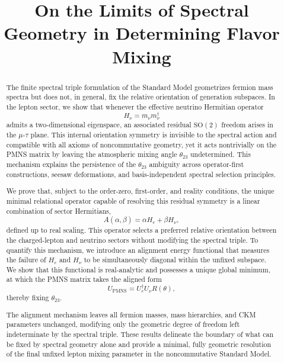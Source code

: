 \usepackage{amsfonts}
\usepackage{amstext}
\usepackage{amsopn}
\usepackage{amsthm}
\usepackage{amssymb}
\usepackage{amsmath}
\usepackage{hyperref}



\title{On the Limits of Spectral Geometry in Determining Flavor Mixing}

\maketitle

\begin{abstract}
The finite spectral triple formulation of the Standard Model geometrizes fermion mass spectra but does not, in general, fix the relative orientation of generation subspaces. In the lepton sector, we show that whenever the effective neutrino Hermitian operator
\[
H_\nu = m_\nu m_\nu^\dagger
\]
admits a two-dimensional eigenspace, an associated residual $\mathrm{SO}(2)$ freedom arises in the $\mu$-$\tau$ plane. This internal orientation symmetry is invisible to the spectral action and compatible with all axioms of noncommutative geometry, yet it acts nontrivially on the PMNS matrix by leaving the atmospheric mixing angle $\theta_{23}$ undetermined. This mechanism explains the persistence of the $\theta_{23}$ ambiguity across operator-first constructions, seesaw deformations, and basis-independent spectral selection principles.

We prove that, subject to the order-zero, first-order, and reality conditions, the unique minimal relational operator capable of resolving this residual symmetry is a linear combination of sector Hermitians,
\[
A(\alpha,\beta) = \alpha H_e + \beta H_\nu,
\]
defined up to real scaling. This operator selects a preferred relative orientation between the charged-lepton and neutrino sectors without modifying the spectral triple. To quantify this mechanism, we introduce an alignment energy functional that measures the failure of $H_e$ and $H_\nu$ to be simultaneously diagonal within the unfixed subspace. We show that this functional is real-analytic and possesses a unique global minimum, at which the PMNS matrix takes the aligned form
\[
U_{\mathrm{PMNS}} = U_e^\dagger U_\nu R(\theta),
\]
thereby fixing $\theta_{23}$.

The alignment mechanism leaves all fermion masses, mass hierarchies, and CKM parameters unchanged, modifying only the geometric degree of freedom left indeterminate by the spectral triple. These results delineate the boundary of what can be fixed by spectral geometry alone and provide a minimal, fully geometric resolution of the final unfixed lepton mixing parameter in the noncommutative Standard Model.
\end{abstract}


